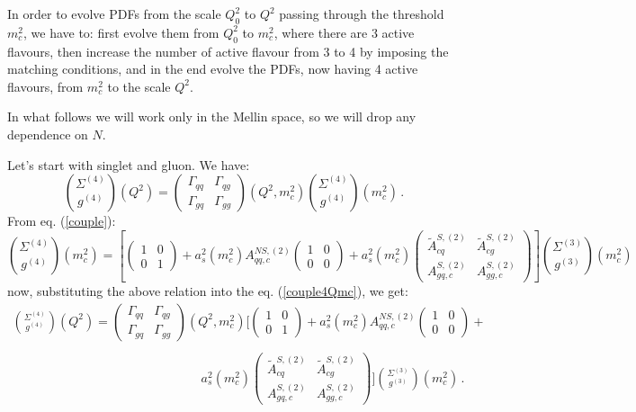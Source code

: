 \documentclass[10pt,a4paper]{article}
\begin{document}
In order to evolve PDFs from the scale $Q_0^2$ to $Q^2$ passing
through the threshold $m_c^2$, we have to: first evolve them from
$Q^2_0$ to $m_c^2$, where there are 3 active flavours, then increase
the number of active flavour from 3 to 4 by imposing the matching
conditions, and in the end evolve the PDFs, now having 4 active
flavours, from $m_c^2$ to the scale $Q^2$.

In what follows we will work only in the Mellin space, so we will drop
any dependence on $N$.

Let's start with singlet and gluon. We have:
\begin{equation}\label{couple4Qmc}
{\Sigma^{(4)} \choose g^{(4)}}(Q^2) = \begin{pmatrix} \Gamma_{qq} & \Gamma_{qg} \\ \Gamma_{gq}& \Gamma_{gg}\end{pmatrix}(Q^2,m_c^2){\Sigma^{(4)} \choose g^{(4)}}(m_c^2)\,.
\end{equation}
From eq. (\ref{couple}):
\begin{equation}
\displaystyle {\Sigma^{(4)} \choose g^{(4)}}(m_c^2)=\left[\begin{pmatrix} 1 & 0 \\ 0 & 1\end{pmatrix}+a_s^2(m_c^2)A_{qq,c}^{N\!S,(2)}\begin{pmatrix} 1 & 0 \\ 0 & 0\end{pmatrix}+a_s^2(m_c^2)\begin{pmatrix} \tilde{A}^{S,(2)}_{cq} & \tilde{A}^{S,(2)}_{cg} \\A^{S,(2)}_{gq,c} & A_{gg,c}^{S,(2)}\end{pmatrix}\right]{\Sigma^{(3)} \choose g^{(3)}}(m_c^2)
\end{equation}
now, substituting the above relation into the eq. (\ref{couple4Qmc}),
we get:
\begin{equation}\label{couple43Qmc}
\begin{array}{l}
\displaystyle {\Sigma^{(4)} \choose g^{(4)}}(Q^2) = \begin{pmatrix} \Gamma_{qq} & \Gamma_{qg} \\ \Gamma_{gq}& \Gamma_{gg}\end{pmatrix}(Q^2,m_c^2)\Bigg[\begin{pmatrix} 1 & 0 \\ 0 & 1\end{pmatrix}+a_s^2(m_c^2)A_{qq,c}^{N\!S,(2)}\begin{pmatrix} 1 & 0 \\ 0 & 0\end{pmatrix}+\\
\\
\hspace{180pt}\displaystyle a_s^2(m_c^2)\begin{pmatrix} \tilde{A}^{S,(2)}_{cq} & \tilde{A}^{S,(2)}_{cg} \\A^{S,(2)}_{gq,c} & A_{gg,c}^{S,(2)}\end{pmatrix}\Bigg]{\Sigma^{(3)} \choose g^{(3)}}(m_c^2)\,.
\end{array}
\end{equation}
\end{document}
